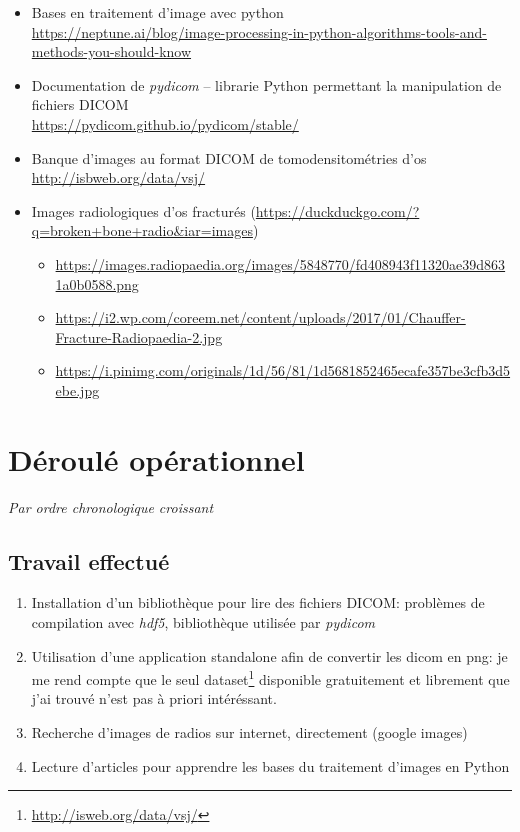 \documentclass{article}
\begin{document}
\begin{itemize}
	\item Bases en traitement d'image avec python \\ {\small \url{https://neptune.ai/blog/image-processing-in-python-algorithms-tools-and-methods-you-should-know}} \\[0.1pt]
	\item Documentation de \emph{pydicom} -- librarie Python permettant la manipulation de fichiers DICOM \\ \url{https://pydicom.github.io/pydicom/stable/}\\[0.1pt]
	\item Banque d'images au format DICOM de tomodensitométries d'os \\ \url{http://isbweb.org/data/vsj/}\\[0.1pt]
	\item Images radiologiques d'os fracturés {\footnotesize (\url{https://duckduckgo.com/?q=broken+bone+radio&iar=images})}
		\begin{itemize}
			\item \url{https://images.radiopaedia.org/images/5848770/fd408943f11320ae39d8631a0b0588.png}
			\item \url{https://i2.wp.com/coreem.net/content/uploads/2017/01/Chauffer-Fracture-Radiopaedia-2.jpg}
			\item \url{https://i.pinimg.com/originals/1d/56/81/1d5681852465ecafe357be3cfb3d5ebe.jpg}
		\end{itemize} %
\end{itemize}

\section{Déroulé opérationnel}

\emph{Par ordre chronologique croissant} 

\subsection{Travail effectué}


\begin{enumerate}
\item Installation d'un bibliothèque pour lire des fichiers DICOM: problèmes de compilation avec \emph{hdf5}, bibliothèque utilisée par \emph{pydicom} 
\item Utilisation d'une application standalone afin de convertir les dicom en png: je me rend compte que le seul dataset\footnote{\url{http://isweb.org/data/vsj/}} disponible gratuitement et librement que j'ai trouvé
	n'est pas à priori intéréssant.
\item Recherche d'images de radios sur internet, directement (google images)
\item Lecture d'articles pour apprendre les bases du traitement d'images en Python
\end{enumerate}
\end{document}
